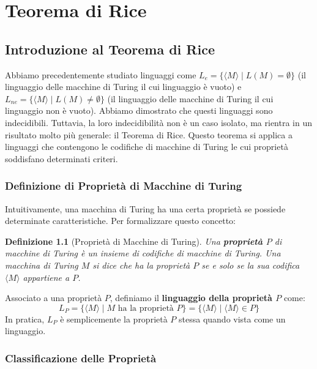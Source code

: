 \documentclass[a4paper, 11pt]{book} %
\newtheorem{definition}[theorem]{Definizione}
\theoremstyle{definition}
\begin{document}

\chapter{Teorema di Rice}



\section{Introduzione al Teorema di Rice}

Abbiamo precedentemente studiato linguaggi come $L_e = \{\langle M \rangle \mid L(M) = \emptyset\}$ (il linguaggio delle macchine di Turing il cui linguaggio è vuoto) e $L_{ne} = \{\langle M \rangle \mid L(M) \neq \emptyset\}$ (il linguaggio delle macchine di Turing il cui linguaggio non è vuoto). Abbiamo dimostrato che questi linguaggi sono indecidibili. Tuttavia, la loro indecidibilità non è un caso isolato, ma rientra in un risultato molto più generale: il Teorema di Rice. Questo teorema si applica a linguaggi che contengono le codifiche di macchine di Turing le cui proprietà soddisfano determinati criteri.

\subsection{Definizione di Proprietà di Macchine di Turing}

Intuitivamente, una macchina di Turing ha una certa proprietà se possiede determinate caratteristiche. Per formalizzare questo concetto:

\begin{definition}[Proprietà di Macchine di Turing]
Una \textbf{proprietà $P$} di macchine di Turing è un insieme di codifiche di macchine di Turing.
Una macchina di Turing $M$ si dice che ha la proprietà $P$ se e solo se la sua codifica $\langle M \rangle$ appartiene a $P$.
\end{definition}

Associato a una proprietà $P$, definiamo il \textbf{linguaggio della proprietà $P$} come:
\[ L_P = \{ \langle M \rangle \mid M \text{ ha la proprietà } P \} = \{ \langle M \rangle \mid \langle M \rangle \in P \} \]
In pratica, $L_P$ è semplicemente la proprietà $P$ stessa quando vista come un linguaggio.

\subsection{Classificazione delle Proprietà}
\end{document}
